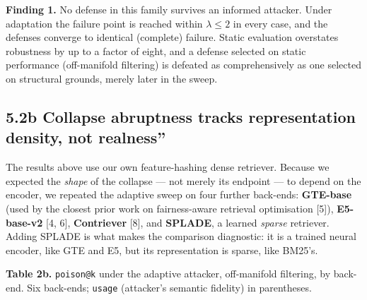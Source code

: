 \documentclass[review,3p,times]{elsarticle}
\begin{document}
\textbf{Finding 1.} No defense in this family survives an informed attacker. Under adaptation the failure point is reached within \(\lambda \le 2\) in every case, and the defenses converge to identical (complete) failure. Static evaluation overstates robustness by up to a factor of eight, and a defense selected on static performance (off-manifold filtering) is defeated as comprehensively as one selected on structural grounds, merely later in the sweep.

\subsection{5.2b Collapse abruptness tracks representation density, not \texttt{}realness''}\label{b-collapse-abruptness-tracks-representation-density-not-realness}

The results above use our own feature-hashing dense retriever. Because we expected the \emph{shape} of the collapse --- not merely its endpoint --- to depend on the encoder, we repeated the adaptive sweep on four further back-ends: \textbf{GTE-base} (used by the closest prior work on fairness-aware retrieval optimisation {[}5{]}), \textbf{E5-base-v2} {[}4, 6{]}, \textbf{Contriever} {[}8{]}, and \textbf{SPLADE}, a learned \emph{sparse} retriever. Adding SPLADE is what makes the comparison diagnostic: it is a trained neural encoder, like GTE and E5, but its representation is sparse, like BM25's.

\textbf{Table 2b.} \texttt{poison@k} under the adaptive attacker, off-manifold filtering, by back-end. Six back-ends; \texttt{usage} (attacker's semantic fidelity) in parentheses.
\end{document}
